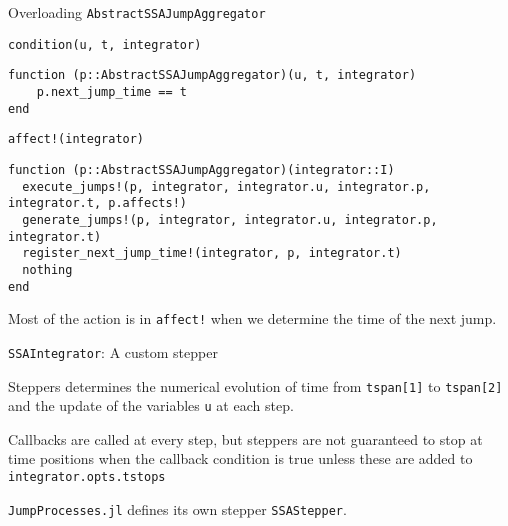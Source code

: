 \documentclass[
  ignorenonframetext,
  aspectratio=169,
  xcolor={dvipsnames,rgb}
]{beamer}
\begin{document}
\begin{frame}[fragile]{Overloading \texttt{AbstractSSAJumpAggregator}}

\texttt{condition(u, t, integrator)}
\vspace{-1em}
\begin{lstlisting}
function (p::AbstractSSAJumpAggregator)(u, t, integrator)
    p.next_jump_time == t
end
\end{lstlisting}
\vspace{-1em}

\texttt{affect!(integrator)}
\vspace{-1em}
\begin{lstlisting}
function (p::AbstractSSAJumpAggregator)(integrator::I)
  execute_jumps!(p, integrator, integrator.u, integrator.p, integrator.t, p.affects!)
  generate_jumps!(p, integrator, integrator.u, integrator.p, integrator.t)
  register_next_jump_time!(integrator, p, integrator.t)
  nothing
end
\end{lstlisting}
\vspace{-1em}

Most of the action is in \texttt{affect!} when we determine the time of the next jump.

\end{frame}

\begin{frame}[fragile]{\texttt{SSAIntegrator}: A custom stepper}

Steppers determines the numerical evolution of time from \texttt{tspan[1]} to \texttt{tspan[2]} and the update of the variables \texttt{u} at each step.

Callbacks are called at every step, but steppers are not guaranteed to stop at time positions when the callback condition is true unless these are added to \texttt{integrator.opts.tstops}

\texttt{JumpProcesses.jl} defines its own stepper \texttt{SSAStepper}.

\end{frame}


\end{document}
